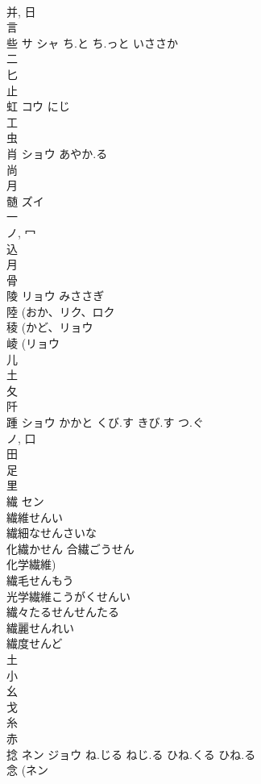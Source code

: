 \documentclass[8pt]{extreport}
\begin{document}
\begin{CJK}{UTF8}{min}
\\	并, 日 
\\	言 
\\	些	サ シャ	ち.と ち.っと いささか	
\\	二 
\\	匕 
\\	止 
\\	虹	コウ	にじ	
\\	工 
\\	虫 
\\	肖	ショウ	あやか.る	
\\	尚 
\\	月 
\\	髄	ズイ		
\\	一 
\\	ノ, 冖 
\\	込 
\\	月 
\\	骨 
\\	陵	リョウ	みささぎ	
\\	陸 (おか、リク、ロク 
\\	稜 (かど、リョウ 
\\	崚 (リョウ 
\\	儿 
\\	土 
\\	夂 
\\	阡	
\\	踵	ショウ	かかと くび.す きび.す つ.ぐ	
\\	ノ, 口 
\\	田 
\\	足 
\\	里 
\\	繊	セン		
\\	繊維せんい 
\\	繊細なせんさいな 
\\	化繊かせん 合繊ごうせん 
\\	化学繊維) 
\\	繊毛せんもう 
\\	光学繊維こうがくせんい 
\\	繊々たるせんせんたる 
\\	繊麗せんれい 
\\	繊度せんど 
\\	土 
\\	小 
\\	幺 
\\	戈 
\\	糸 
\\	赤 
\\	捻	ネン ジョウ	ね.じる ねじ.る ひね.くる ひね.る	
\\	念 (ネン 

\end{CJK}
\end{document}

